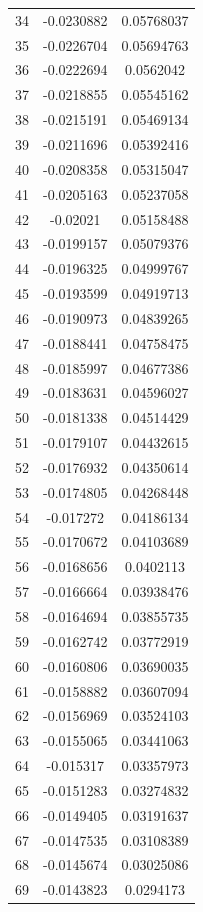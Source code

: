 \documentclass[a4paper, 11pt, oneside]{report}
\begin{document}
{\begin{longtable}{|c|c|c|}
34  & -0.0230882 & 0.05768037 \\
35  & -0.0226704 & 0.05694763 \\
36  & -0.0222694 & 0.0562042  \\
37  & -0.0218855 & 0.05545162 \\
38  & -0.0215191 & 0.05469134 \\
39  & -0.0211696 & 0.05392416 \\
40  & -0.0208358 & 0.05315047 \\
41  & -0.0205163 & 0.05237058 \\
42  & -0.02021   & 0.05158488 \\
43  & -0.0199157 & 0.05079376 \\
44  & -0.0196325 & 0.04999767 \\
45  & -0.0193599 & 0.04919713 \\
46  & -0.0190973 & 0.04839265 \\
47  & -0.0188441 & 0.04758475 \\
48  & -0.0185997 & 0.04677386 \\
49  & -0.0183631 & 0.04596027 \\
50  & -0.0181338 & 0.04514429 \\
51  & -0.0179107 & 0.04432615 \\
52  & -0.0176932 & 0.04350614 \\
53  & -0.0174805 & 0.04268448 \\
54  & -0.017272  & 0.04186134 \\
55  & -0.0170672 & 0.04103689 \\
56  & -0.0168656 & 0.0402113  \\
57  & -0.0166664 & 0.03938476 \\
58  & -0.0164694 & 0.03855735 \\
59  & -0.0162742 & 0.03772919 \\
60  & -0.0160806 & 0.03690035 \\
61  & -0.0158882 & 0.03607094 \\
62  & -0.0156969 & 0.03524103 \\
63  & -0.0155065 & 0.03441063 \\
64  & -0.015317  & 0.03357973 \\
65  & -0.0151283 & 0.03274832 \\
66  & -0.0149405 & 0.03191637 \\
67  & -0.0147535 & 0.03108389 \\
68  & -0.0145674 & 0.03025086 \\
69  & -0.0143823 & 0.0294173  \\

\end{longtable}}
\end{document}
